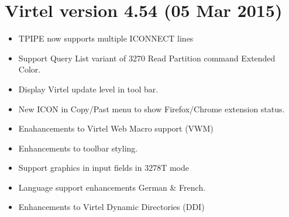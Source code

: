 \documentclass[letterpaper,10pt,english]{sphinxmanual}
\begin{document}
\section{Virtel version 4.54 (05 Mar 2015)}
\label{\detokenize{Installation_Guide:virtel-version-4-54-05-mar-2015}}
\sphinxAtStartPar
{}
\begin{itemize}
\item {} 
\sphinxAtStartPar
TPIPE now supports multiple ICONNECT lines

\end{itemize}

\sphinxAtStartPar
{}
\begin{itemize}
\item {} 
\sphinxAtStartPar
Support Query List variant of 3270 Read Partition command \sphinxhyphen{} Extended Color.

\item {} 
\sphinxAtStartPar
Display Virtel update level in tool bar.

\item {} 
\sphinxAtStartPar
New ICON in Copy/Past menu to show Firefox/Chrome extension status.

\item {} 
\sphinxAtStartPar
Enahancements to Virtel Web Macro support (VWM)

\item {} 
\sphinxAtStartPar
Enhancements to toolbar styling.

\item {} 
\sphinxAtStartPar
Support graphics in input fields in 3278T mode

\item {} 
\sphinxAtStartPar
Language support enhancements \sphinxhyphen{} German \& French.

\item {} 
\sphinxAtStartPar
Enhancements to Virtel Dynamic Directories (DDI)

\end{itemize}
\end{document}
